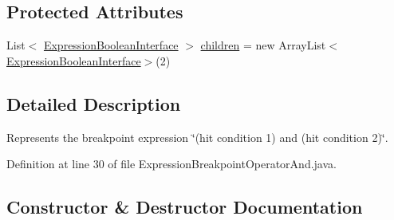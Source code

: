 \subsection*{Protected Attributes}
\begin{DoxyCompactItemize}
\item 
List$<$ \hyperlink{interfacegov_1_1nasa_1_1jpf_1_1inspector_1_1server_1_1expression_1_1_expression_boolean_interface}{Expression\+Boolean\+Interface} $>$ \hyperlink{classgov_1_1nasa_1_1jpf_1_1inspector_1_1server_1_1expression_1_1_expression_boolean_binary_operator_aa51f2a94e4b46898cc588a25f3957f6f}{children} = new Array\+List$<$\hyperlink{interfacegov_1_1nasa_1_1jpf_1_1inspector_1_1server_1_1expression_1_1_expression_boolean_interface}{Expression\+Boolean\+Interface}$>$(2)
\end{DoxyCompactItemize}


\subsection{Detailed Description}
Represents the breakpoint expression \char`\"{}(hit condition 1) and (hit condition 2)\char`\"{}. 

Definition at line 30 of file Expression\+Breakpoint\+Operator\+And.\+java.



\subsection{Constructor \& Destructor Documentation}
